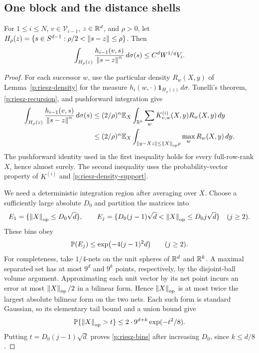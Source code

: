 \subsection{One block and the distance shells}

\begin{lemma}\label{p:riesz-shell}
For $1\le i\le N$, $v\in\mathcal V_{i-1}$, $z\in\R^d$, and
$\rho>0$, let
$H_\rho(z)=\{s\in S^{d-1}:\rho/2<\norm{s-z}\le\rho\}$.
Then
\begin{equation}\label{p:riesz-shell-bound}
 \int_{H_\rho(z)}
   \frac{h_{i-1}(v,s)}{\norm{s-z}^{\alpha}}\,d\sigma(s)
 \le C^d W^{1/q}V_i.
\end{equation}
\end{lemma}

\begin{proof}
For each successor $w$, use the particular density $R_w(X,y)$
of Lemma~\ref{p:riesz-density} for the measure
$h_i(w,\cdot)\mathbf1_{H_\rho(z)}\,d\sigma$.
Tonelli's theorem, \eqref{p:riesz-recursion}, and pushforward
integration give
\begin{equation}\label{p:riesz-shell-pushforward}
\begin{split}
 \int_{H_\rho(z)}
    \frac{h_{i-1}(v,s)}{\norm{s-z}^{\alpha}}\,d\sigma(s)
 &\le (2/\rho)^\alpha
       \E_X\int_{\R^k}
       \sum_wK^{(i)}_{v,w}(X,y)R_w(X,y)\,dy\\
 &\le (2/\rho)^\alpha
       \E_X\int_{\norm{y-Xz}\le\norm X_{\mathrm{op}}\rho}
       \max_wR_w(X,y)\,dy .
\end{split}
\end{equation}
The pushforward identity used in the first inequality holds for every
full-row-rank $X$, hence almost surely.  The second inequality uses
the probability-vector property of $K^{(i)}$ and
\eqref{p:riesz-density-support}.

We need a deterministic integration region after averaging over
$X$.  Choose a sufficiently large absolute $D_0$ and partition
the matrices into
\[
 E_1=\{\norm X_{\mathrm{op}}\le D_0\sqrt d\},\qquad
 E_j=\{D_0(j-1)\sqrt d<\norm X_{\mathrm{op}}\le D_0j\sqrt d\}
 \quad(j\ge2).
\]
These bins obey
\begin{equation}\label{p:riesz-bins}
 \P(E_j)\le \exp\bigl(-4(j-1)^2d\bigr)\qquad(j\ge2).
\end{equation}
For completeness, take $1/4$-nets on the unit spheres of $\R^d$
and $\R^k$.  A maximal separated set has at most $9^d$ and
$9^k$ points, respectively, by the disjoint-ball volume argument.
Approximating each unit vector by its net point incurs an error
at most $\norm X_{\mathrm{op}}/2$ in a bilinear form.  Hence
$\norm X_{\mathrm{op}}$ is at most twice the largest absolute
bilinear form on the two nets.  Each such form is standard
Gaussian, so its elementary tail bound and a union bound give
\begin{equation}\label{p:riesz-operator-tail}
 \P\{\norm X_{\mathrm{op}}>t\}
 \le 2\cdot9^{d+k}\exp(-t^2/8).
\end{equation}
Putting $t=D_0(j-1)\sqrt d$ proves
\eqref{p:riesz-bins} after increasing $D_0$, since $k\le d/8$.


\end{proof}
